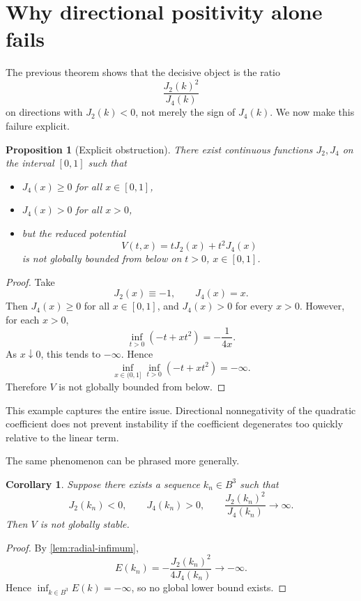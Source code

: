 \documentclass[11pt,a4paper]{article}
\theoremstyle{plain}
\newtheorem{proposition}[theorem]{Proposition}
\newtheorem{corollary}[theorem]{Corollary}
\theoremstyle{definition}
\theoremstyle{remark}
\begin{document}
\section{Why directional positivity alone fails}

The previous theorem shows that the decisive object is the ratio
\[
\frac{J_2(k)^2}{J_4(k)}
\]
on directions with $J_2(k)<0$, not merely the sign of $J_4(k)$. We now make this failure explicit.

\begin{proposition}[Explicit obstruction]\label{prop:counterexample}
There exist continuous functions $J_2,J_4$ on the interval $[0,1]$ such that
\begin{itemize}[leftmargin=1.8em]
\item $J_4(x)\ge 0$ for all $x\in[0,1]$,
\item $J_4(x)>0$ for all $x>0$,
\item but the reduced potential
\[
V(t,x)=tJ_2(x)+t^2J_4(x)
\]
is not globally bounded from below on $t>0$, $x\in[0,1]$.
\end{itemize}
\end{proposition}

\begin{proof}
Take
\[
J_2(x)\equiv -1,\qquad J_4(x)=x.
\]
Then $J_4(x)\ge 0$ for all $x\in[0,1]$, and $J_4(x)>0$ for every $x>0$. However, for each $x>0$,
\[
\inf_{t>0}( -t + xt^2 ) = -\frac{1}{4x}.
\]
As $x\downarrow 0$, this tends to $-\infty$. Hence
\[
\inf_{x\in(0,1]} \inf_{t>0}( -t + xt^2 )=-\infty.
\]
Therefore $V$ is not globally bounded from below.
\end{proof}

This example captures the entire issue. Directional nonnegativity of the quadratic coefficient does not prevent instability if the coefficient degenerates too quickly relative to the linear term.

The same phenomenon can be phrased more generally.

\begin{corollary}\label{cor:sequence-obstruction}
Suppose there exists a sequence $k_n\in B^3$ such that
\[
J_2(k_n)<0,\qquad J_4(k_n)>0,\qquad
\frac{J_2(k_n)^2}{J_4(k_n)}\to\infty.
\]
Then $V$ is not globally stable.
\end{corollary}

\begin{proof}
By \cref{lem:radial-infimum},
\[
E(k_n)=-\frac{J_2(k_n)^2}{4J_4(k_n)}\to -\infty.
\]
Hence $\inf_{k\in B^3}E(k)=-\infty$, so no global lower bound exists.
\end{proof}
\end{document}
